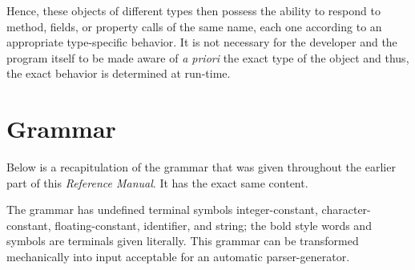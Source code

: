 \documentclass[12pt]{report}
\begin{document}
Hence, these objects of different types then possess the ability to respond to method, fields, or property calls of the same name, each one according to an appropriate type-specific behavior. It is not necessary for the developer and the program itself to be made aware of \textit{a priori} the exact type of the object and thus, the exact behavior is determined at run-time.

\section{Grammar}

Below is a recapitulation of the grammar that was given throughout the earlier part of this \textit{Reference Manual}. It has the exact same content.

The grammar has undefined terminal symbols integer-constant, character-constant, floating-constant, identifier, and string; the bold style words and symbols are terminals given literally. This grammar can be transformed mechanically into input acceptable for an automatic parser-generator. 
\end{document}
